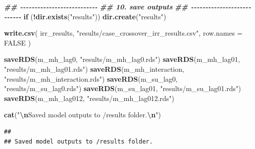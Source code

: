 \documentclass[
]{article}
\newenvironment{Shaded}{\begin{snugshade}}{\end{snugshade}}
\newcommand{\AttributeTok}[1]{\textcolor[rgb]{0.13,0.29,0.53}{#1}}
\newcommand{\ConstantTok}[1]{\textcolor[rgb]{0.56,0.35,0.01}{#1}}
\newcommand{\ControlFlowTok}[1]{\textcolor[rgb]{0.13,0.29,0.53}{\textbf{#1}}}
\newcommand{\DocumentationTok}[1]{\textcolor[rgb]{0.56,0.35,0.01}{\textbf{\textit{#1}}}}
\newcommand{\FunctionTok}[1]{\textcolor[rgb]{0.13,0.29,0.53}{\textbf{#1}}}
\newcommand{\NormalTok}[1]{#1}
\newcommand{\SpecialCharTok}[1]{\textcolor[rgb]{0.81,0.36,0.00}{\textbf{#1}}}
\newcommand{\StringTok}[1]{\textcolor[rgb]{0.31,0.60,0.02}{#1}}
\begin{document}
\begin{Shaded}
\begin{Highlighting}[]
\DocumentationTok{\#\# {-}{-}{-}{-}{-}{-}{-}{-}{-}{-}{-}{-}{-}{-}{-}{-}{-}{-}{-}{-}{-}{-}{-}{-}{-}{-}{-}}
\DocumentationTok{\#\# 10. save outputs}
\DocumentationTok{\#\# {-}{-}{-}{-}{-}{-}{-}{-}{-}{-}{-}{-}{-}{-}{-}{-}{-}{-}{-}{-}{-}{-}{-}{-}{-}{-}{-}}
\ControlFlowTok{if}\NormalTok{ (}\SpecialCharTok{!}\FunctionTok{dir.exists}\NormalTok{(}\StringTok{"results"}\NormalTok{)) }\FunctionTok{dir.create}\NormalTok{(}\StringTok{"results"}\NormalTok{)}

\FunctionTok{write.csv}\NormalTok{(}
\NormalTok{  irr\_results,}
  \StringTok{"results/case\_crossover\_irr\_results.csv"}\NormalTok{,}
  \AttributeTok{row.names =} \ConstantTok{FALSE}
\NormalTok{)}

\FunctionTok{saveRDS}\NormalTok{(m\_mh\_lag0, }\StringTok{"results/m\_mh\_lag0.rds"}\NormalTok{)}
\FunctionTok{saveRDS}\NormalTok{(m\_mh\_lag01, }\StringTok{"results/m\_mh\_lag01.rds"}\NormalTok{)}
\FunctionTok{saveRDS}\NormalTok{(m\_mh\_interaction, }\StringTok{"results/m\_mh\_interaction.rds"}\NormalTok{)}
\FunctionTok{saveRDS}\NormalTok{(m\_su\_lag0, }\StringTok{"results/m\_su\_lag0.rds"}\NormalTok{)}
\FunctionTok{saveRDS}\NormalTok{(m\_su\_lag01, }\StringTok{"results/m\_su\_lag01.rds"}\NormalTok{)}
\FunctionTok{saveRDS}\NormalTok{(m\_mh\_lag012, }\StringTok{"results/m\_mh\_lag012.rds"}\NormalTok{)}

\FunctionTok{cat}\NormalTok{(}\StringTok{"}\SpecialCharTok{\textbackslash{}n}\StringTok{Saved model outputs to /results folder.}\SpecialCharTok{\textbackslash{}n}\StringTok{"}\NormalTok{)}
\end{Highlighting}
\end{Shaded}

\begin{verbatim}
## 
## Saved model outputs to /results folder.
\end{verbatim}
\end{document}
